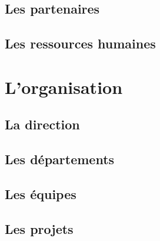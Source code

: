         \subsection{Les partenaires}
        \paragraph{}
        \subsection{Les ressources humaines}
        \paragraph{}
\section{L'organisation}
\paragraph{}
        \subsection{La direction}
        \paragraph{}
        \subsection{Les départements}
        \paragraph{}
        \subsection{Les équipes}
        \paragraph{}
        \subsection{Les projets}
        \paragraph{}
